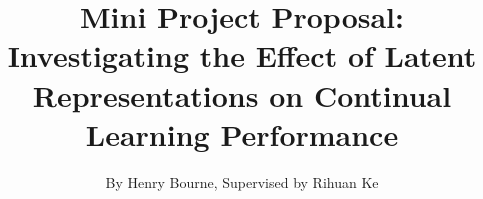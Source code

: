 \documentclass[a4paper]{article}
\title{Mini Project Proposal: \\ Investigating the Effect of Latent Representations on Continual Learning Performance}
\author{By Henry Bourne, Supervised by Rihuan Ke}
\date{}
\begin{document}
\maketitle




% 

\small


\end{document}
